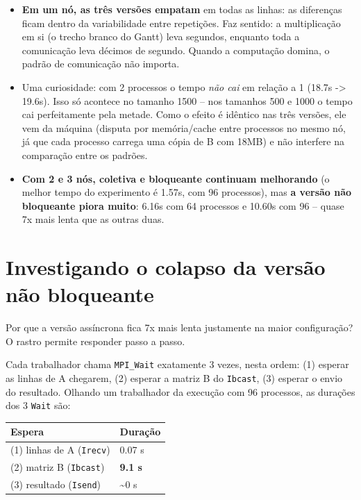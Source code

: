 \begin{itemize}
\tightlist
\item
  \textbf{Em um nó, as três versões empatam} em todas as linhas: as
  diferenças ficam dentro da variabilidade entre repetições. Faz
  sentido: a multiplicação em si (o trecho branco do Gantt) leva
  segundos, enquanto toda a comunicação leva décimos de segundo. Quando
  a computação domina, o padrão de comunicação não importa.
\item
  Uma curiosidade: com 2 processos o tempo \emph{não cai} em relação a 1
  (18.7s -\textgreater{} 19.6s). Isso só acontece no tamanho 1500 -- nos
  tamanhos 500 e 1000 o tempo cai perfeitamente pela metade. Como o
  efeito é idêntico nas três versões, ele vem da máquina (disputa por
  memória/cache entre processos no mesmo nó, já que cada processo
  carrega uma cópia de B com 18MB) e não interfere na comparação entre
  os padrões.
\item
  \textbf{Com 2 e 3 nós, coletiva e bloqueante continuam melhorando} (o
  melhor tempo do experimento é 1.57s, com 96 processos), mas \textbf{a
  versão não bloqueante piora muito}: 6.16s com 64 processos e 10.60s
  com 96 -- quase 7x mais lenta que as outras duas.
\end{itemize}

\section{Investigando o colapso da versão não
bloqueante}\label{investigando-o-colapso-da-versuxe3o-nuxe3o-bloqueante}

Por que a versão assíncrona fica 7x mais lenta justamente na maior
configuração? O rastro permite responder passo a passo.

Cada trabalhador chama \texttt{MPI\_Wait} exatamente 3 vezes, nesta
ordem: (1) esperar as linhas de A chegarem, (2) esperar a matriz B do
\texttt{Ibcast}, (3) esperar o envio do resultado. Olhando um
trabalhador da execução com 96 processos, as durações dos 3
\texttt{Wait} são:

\begin{longtable}[]{@{}ll@{}}
\toprule\noalign{}
Espera & Duração \\
\midrule\noalign{}
\endhead
\bottomrule\noalign{}
\endlastfoot
(1) linhas de A (\texttt{Irecv}) & 0.07 s \\
(2) matriz B (\texttt{Ibcast}) & \textbf{9.1 s} \\
(3) resultado (\texttt{Isend}) & \textasciitilde0 s \\
\end{longtable}

